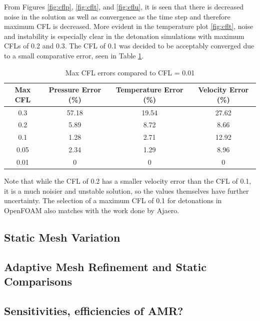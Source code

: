 From Figures \ref{fig:cflp}, \ref{fig:cflt}, and \ref{fig:cflu}, it is seen that there is decreased noise in the solution as well as convergence as the time step and therefore maximum CFL is decreased. More evident in the temperature plot \ref{fig:cflt}, noise and instability is especially clear in the detonation simulations with maximum CFLs of 0.2 and 0.3. The CFL of 0.1 was decided to be acceptably converged due to a small comparative error, seen in Table \ref{tab:cflerror}. 
\begin{table}[]
\centering
\caption{Max CFL errors compared to CFL = 0.01}
\label{tab:cflerror}
\begin{tabular}{cccc}
Max CFL & Pressure Error (\%) & Temperature Error (\%) & Velocity Error (\%) \\ \hline
0.3 & 57.18 & 19.54 & 27.62 \\ 
0.2 & 5.89 & 8.72 & 8.66 \\
0.1 & 1.28 & 2.71 & 12.92 \\
0.05 & 2.34 & 1.29 & 8.96 \\
0.01 & 0 & 0 & 0 \\
\end{tabular}
\end{table}%
\noindent Note that while the CFL of 0.2 has a smaller velocity error than the CFL of 0.1, it is a much noisier and unstable solution, so the values themselves have further uncertainty. The selection of a maximum CFL of 0.1  for detonations in OpenFOAM also matches with the work done by Ajaero\cite{ajaero}. 

\subsection{Static Mesh Variation}

\subsection{Adaptive Mesh Refinement and Static Comparisons}

\subsection{Sensitivities, efficiencies of AMR?}